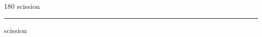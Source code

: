 
\begin{frame}
\begin{center}
\begin{turn}{180}
{\fontsize{2.5cm}{1em}\selectfont scission}
\end{turn}
\vspace{1em}\par  
\hrule
\vspace{1em}\par  
{\fontsize{2.5cm}{1em}\selectfont scission}
\end{center}
\end{frame}
